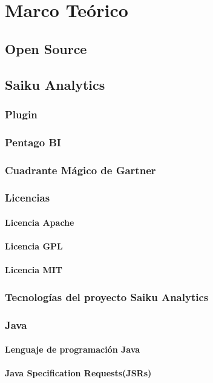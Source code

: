 \chapter{Marco Teórico} \label{chapter:II}
\section{Open Source}
\section{Saiku Analytics}
	\subsection{Plugin}
	\subsection{Pentago BI}
	\subsection{Cuadrante M\'{a}gico de Gartner}
	\subsection{Licencias}
		\subsubsection{Licencia Apache}
		\subsubsection{Licencia GPL}
		\subsubsection{Licencia MIT}
	\subsection{Tecnolog\'{i}as del proyecto Saiku Analytics}		
	\subsection{Java}
		\subsubsection{Lenguaje de programaci\'{o}n Java}
		\subsubsection{Java Specification Requests(JSRs)}
